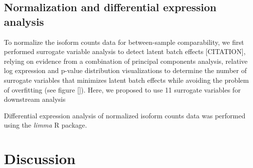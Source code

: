 \subsection{Normalization and differential expression analysis}
To normalize the isoform counts data for between-sample comparability, we first performed surrogate variable analysis to detect latent batch effects [CITATION], relying on evidence from a combination of principal components analysis, relative log expression and p-value distribution visualizations to determine the number of surrogate variables that minimizes latent batch effects while avoiding the problem of overfitting (see figure []). Here, we proposed to use 11 surrogate variables for downstream analysis\par
Differential expression analysis of normalized isoform counts data was performed using the \textit{limma} R package.
\section{Discussion}
